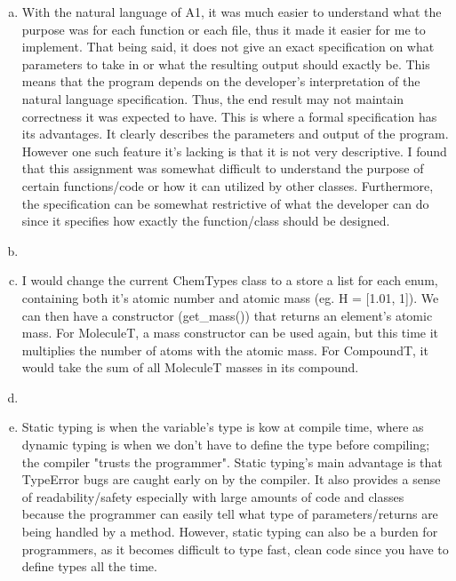 \documentclass[12pt]{article}
\begin{document}
\begin{enumerate}[a)]

\item
With the natural language of A1, it was much easier to understand what the purpose was for each function or each file, thus it made it easier for me to implement. That being said, it does not give an exact specification on what parameters to take in or what the resulting output should exactly be. This means that the program depends on the developer's interpretation of the natural language specification. Thus, the end result may not maintain correctness it was expected to have. 
\newline
This is where a formal specification has its advantages. It clearly describes the parameters and output of the program. However one such feature it's lacking is that it is not very descriptive. I found that this assignment was somewhat difficult to understand the purpose of certain functions/code or how it can utilized by other classes. Furthermore, the specification can be somewhat restrictive of what the developer can do since it specifies how exactly the function/class should be designed.   

\item



\item
I would change the current ChemTypes class to a store a list for each enum, containing both it's atomic number and atomic mass (eg. H = [1.01, 1]). We can then have a constructor (get\_mass()) that returns an element's atomic mass. For MoleculeT, a mass constructor can be used again, but this time it multiplies the number of atoms with the atomic mass. For CompoundT, it would take the sum of all MoleculeT masses in its compound.

\item

\item
Static typing is when the variable's type is kow at compile time, where as dynamic typing is when we don't have to define the type before compiling; the compiler "trusts the programmer". Static typing's main advantage is that TypeError bugs are caught early on by the compiler. It also provides a sense of readability/safety especially with large amounts of code and classes because the programmer can easily tell what type of parameters/returns are being handled by a method. However, static typing can also be a burden for programmers, as it becomes difficult to type fast, clean code since you have to define types all the time.


\end{enumerate}
\end{document}
